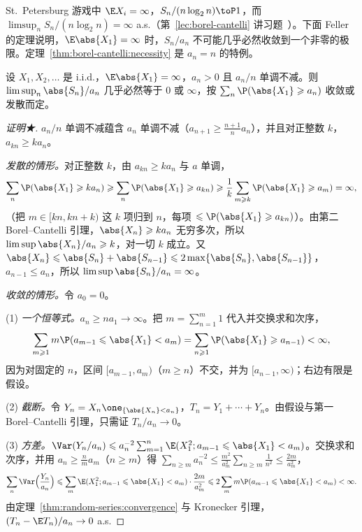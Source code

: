 St.\ Petersburg 游戏中 $\E X_i=\infty$，$S_n/(n\log_2n)\toP1$，而 $\limsup_nS_n/(n\log_2n)=\infty$ a.s.（第~\ref{lec:borel-cantelli} 讲习题~）。下面 Feller 的定理说明，$\E\abs{X_1}=\infty$ 时，$S_n/a_n$ 不可能几乎必然收敛到一个非零的极限。定理~\ref{thm:borel-cantelli:necessity} 是 $a_n=n$ 的特例。

\begin{theorem}[Feller]\label{thm:random-series:feller}
设 $X_1,X_2,\dots$ 是 i.i.d.，$\E\abs{X_1}=\infty$，$a_n>0$ 且 $a_n/n$ 单调不减。则 $\limsup_n\abs{S_n}/a_n$ 几乎必然等于 $0$ 或 $\infty$，按 $\sum_n\P(\abs{X_1}\geqslant a_n)$ 收敛或发散而定。
\end{theorem}
\begin{proof}[证明★]
$a_n/n$ 单调不减蕴含 $a_n$ 单调不减（$a_{n+1}\geqslant\frac{n+1}na_n$），并且对正整数 $k$，$a_{kn}\geqslant ka_n$。

\emph{发散的情形。}对正整数 $k$，由 $a_{kn}\geqslant ka_n$ 与 $a$ 单调，
\[
\sum_n\P(\abs{X_1}\geqslant ka_n)\geqslant\sum_n\P(\abs{X_1}\geqslant a_{kn})\geqslant\frac1k\sum_{m\geqslant k}\P(\abs{X_1}\geqslant a_m)=\infty,
\]
（把 $m\in[kn,kn+k)$ 这 $k$ 项归到 $n$，每项 $\leqslant \P(\abs{X_1}\geqslant a_{kn})$）。由第二 Borel--Cantelli 引理，$\abs{X_n}\geqslant ka_n$ 无穷多次，所以 $\limsup\abs{X_n}/a_n\geqslant k$，对一切 $k$ 成立。又 $\abs{X_n}\leqslant\abs{S_n}+\abs{S_{n-1}}\leqslant2\max\{\abs{S_n},\abs{S_{n-1}}\}$，$a_{n-1}\leqslant a_n$，所以 $\limsup\abs{S_n}/a_n=\infty$。

\emph{收敛的情形。}令 $a_0=0$。

(1) \emph{一个恒等式。}$a_n\geqslant na_1\to\infty$。把 $m=\sum_{n=1}^m1$ 代入并交换求和次序，
\begin{equation}\label{eq:random-series:feller-identity}
\sum_{m\geqslant1}m\P(a_{m-1}\leqslant\abs{X_1}<a_m)=\sum_{n\geqslant1}\P(\abs{X_1}\geqslant a_{n-1})<\infty,
\end{equation}
因为对固定的 $n$，区间 $[a_{m-1},a_m)$（$m\geqslant n$）不交，并为 $[a_{n-1},\infty)$；右边有限是假设。

(2) \emph{截断。}令 $Y_n=X_n\one_{\{\abs{X_n}<a_n\}}$，$T_n=Y_1+\cdots+Y_n$。由假设与第一 Borel--Cantelli 引理，只需证 $T_n/a_n\to0$。

(3) \emph{方差。}$\Var(Y_n/a_n)\leqslant a_n^{-2}\sum_{m=1}^n\E(X_1^2;a_{m-1}\leqslant\abs{X_1}<a_m)$。交换求和次序，并用 $a_n\geqslant\frac nma_m$（$n\geqslant m$）得 $\sum_{n\geqslant m}a_n^{-2}\leqslant\frac{m^2}{a_m^2}\sum_{n\geqslant m}\frac1{n^2}\leqslant\frac{2m}{a_m^2}$，
\[
\sum_n\Var\Bigl(\frac{Y_n}{a_n}\Bigr)\leqslant\sum_m\E(X_1^2;a_{m-1}\leqslant\abs{X_1}<a_m)\cdot\frac{2m}{a_m^2}\leqslant2\sum_mm\P(a_{m-1}\leqslant\abs{X_1}<a_m)<\infty .
\]
由定理~\ref{thm:random-series:convergence} 与 Kronecker 引理，$(T_n-\E T_n)/a_n\to0$ a.s.


\end{proof}
